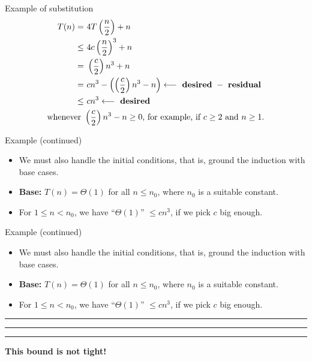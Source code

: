 \documentclass{beamer}
\begin{document}
\begin{frame}{Example of substitution}
    \begin{align*}
        T(n) = & \text{ }4T \left(\frac{n}{2}\right) + n \\
            \leq & \text{ }4c \left(\frac{n}{2}\right)^3 + n \\
                = & \text{ }\left(\frac{c}{2}\right)n^3 + n \\
                = & \text{ }cn^3 - \left(\left(\frac{c}{2}\right)n^3 - n\right) \longleftarrow \text{ \textbf{desired} } - \text{ \textbf{residual} } \\
             \leq & \text{ }cn^3 \longleftarrow \text{ \textbf{desired} } \\
        \text{whenever }& \left(\frac{c}{2}\right)n^3 - n \geq 0\text{, for example, if } c \geq 2 \text{ and } n \geq 1\text{.} 
    \end{align*}
\end{frame}

\begin{frame}{Example (continued)}
    \begin{itemize}
        \item We must also handle the initial conditions, that is, ground the induction with base cases.
        \item \textbf{Base:} $T(n) = \Theta(1)$ for all $n \leq n_0$, where $n_0$ is a suitable constant.
        \item For $1 \leq n < n_0$, we have ``$\Theta(1)$'' $\leq cn^3$, if we pick $c$ big enough.
    \end{itemize}
\end{frame}

\begin{frame}{Example (continued)}
    \begin{itemize}
        \item We must also handle the initial conditions, that is, ground the induction with base cases.
        \item \textbf{Base:} $T(n) = \Theta(1)$ for all $n \leq n_0$, where $n_0$ is a suitable constant.
        \item For $1 \leq n < n_0$, we have ``$\Theta(1)$'' $\leq cn^3$, if we pick $c$ big enough.
    \end{itemize}
    \par\noindent\rule{\textwidth}{0.4pt}\vspace{-4.35mm}
    \par\noindent\rule{\textwidth}{0.8pt}\vspace{-4.50mm}
    \par\noindent\rule{\textwidth}{0.4pt}
    \begin{center}
        \textbf{This bound is not tight!}
    \end{center}
\end{frame}
\end{document}
